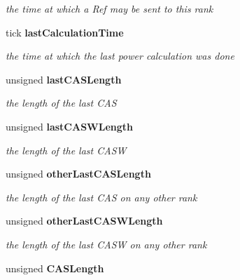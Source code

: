 \begin{DoxyCompactItemize}
\begin{DoxyCompactList}\small\item\em the time at which a Ref may be sent to this rank \item\end{DoxyCompactList}\item 
tick {\bf lastCalculationTime}\label{class_d_r_a_msim_i_i_1_1_rank_a6f7af9163075b15ab345b29a0be875ce}

\begin{DoxyCompactList}\small\item\em the time at which the last power calculation was done \item\end{DoxyCompactList}\item 
unsigned {\bf lastCASLength}\label{class_d_r_a_msim_i_i_1_1_rank_a1e62f84cb1dfb615c3609112b5bb4222}

\begin{DoxyCompactList}\small\item\em the length of the last CAS \item\end{DoxyCompactList}\item 
unsigned {\bf lastCASWLength}\label{class_d_r_a_msim_i_i_1_1_rank_a11af9792fcf7e48ec2df25c807e4708f}

\begin{DoxyCompactList}\small\item\em the length of the last CASW \item\end{DoxyCompactList}\item 
unsigned {\bf otherLastCASLength}\label{class_d_r_a_msim_i_i_1_1_rank_a581c24fba006c13b3acf0ed056cf1914}

\begin{DoxyCompactList}\small\item\em the length of the last CAS on any other rank \item\end{DoxyCompactList}\item 
unsigned {\bf otherLastCASWLength}\label{class_d_r_a_msim_i_i_1_1_rank_a126e34b8d0835a4fe61c2236fa2a3f2c}

\begin{DoxyCompactList}\small\item\em the length of the last CASW on any other rank \item\end{DoxyCompactList}\item 
unsigned {\bf CASLength}\label{class_d_r_a_msim_i_i_1_1_rank_a884e8a2f3771a545733a308dde5dd13f}


\end{DoxyCompactItemize}

